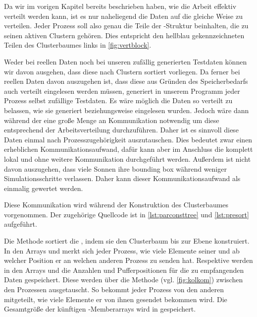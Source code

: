     Da wir im vorigen Kapitel bereits beschrieben haben, wie die Arbeit effektiv verteilt werden kann, ist es nur naheliegend die Daten auf die gleiche Weise zu verteilen. Jeder Prozess soll also 
    genau die Teile der -Struktur beinhalten, die zu seinen aktiven Clustern gehören. Dies entspricht den hellblau gekennzeichneten Teilen des Clusterbaumes links in \autoref{fig:vertblock}.
    
    Weder bei reellen Daten noch bei unseren zufällig generierten Testdaten können wir davon ausgehen, dass diese nach Clustern sortiert vorliegen. Da ferner bei reellen Daten davon auszugehen
    ist, dass diese aus Gründen des Speicherbedarfs auch verteilt eingelesen werden müssen, generiert in unserem Programm jeder Prozess selbst zufällige Testdaten. Es wäre möglich die Daten 
    so verteilt zu belassen, wie sie generiert beziehungsweise eingelesen wurden. Jedoch wäre dann während der \vorruck eine große Menge an Kommunikation notwendig um diese entsprechend der 
    Arbeitsverteilung durchzuführen. Daher ist es sinnvoll diese Daten einmal nach Prozesszugehörigkeit auszutauschen. Dies bedeutet zwar einen erheblichen Kommunikationsaufwand, dafür kann aber im
    Anschluss die \vorruck komplett lokal und ohne weitere Kommunikation durchgeführt werden. Außerdem ist nicht davon auszugehen, dass viele Sonnen ihre bounding box während weniger Simulationsschritte
    verlassen. Daher kann dieser Kommunikationsaufwand als einmalig gewertet werden.
    
    Diese Kommunikation wird während der Konstruktion des Clusterbaumes vorgenommen. Der zugehörige Quellcode ist in \autoref{lst:parconsttree} und \autoref{lst:presort} aufgeführt.
    
    Die Methode  sortiert die , indem sie den Clusterbaum bis zur Ebene  konstruiert. In den Arrays  und 
    merkt sich jeder Prozess, wie viele Elemente seiner  und ab welcher Position er an welchen anderen Prozess zu senden hat. Respektive werden in den Arrays  
    und  die Anzahlen und Pufferpositionen für die zu empfangenden Daten gespeichert. Diese werden über die Methode  (vgl. \autoref{fig:kolkom}) zwischen 
    den Prozessen ausgetauscht. So bekommt jeder Prozess von den anderen mitgeteilt, wie viele Elemente er von ihnen gesendet bekommen wird. Die Gesamtgröße der künftigen -Memberarrays
    wird in  gespeichert.
    
